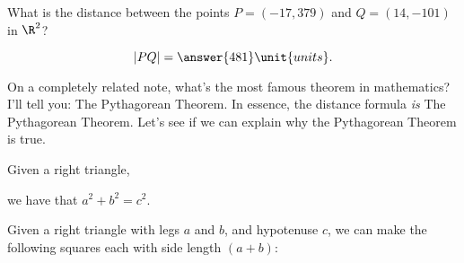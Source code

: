 \documentclass{ximera}
\begin{document}
\begin{question}
  What is the distance between the points $P=(-17,379)$ and
  $Q=(14,-101)$ in $\R^2$?
  \begin{prompt}
    \[
    |PQ|=\answer{481}\unit{units}.
    \]
  \end{prompt}
\end{question}

On a completely related note, what's the most famous theorem in
mathematics? I'll tell you: The Pythagorean Theorem. In essence, the
distance formula \textit{is} The Pythagorean Theorem. Let's see if we
can explain why the Pythagorean Theorem is true.

\begin{theorem}
  Given a right triangle,
  \begin{image}
  \end{image}
  we have that $a^2 + b^2 = c^2.$
  \begin{explanation}
    Given a right triangle with legs $a$ and $b$, and hypotenuse $c$,
    we can make the following squares each with side length $(a+b)$:
    \begin{image}
\end{image}
\end{explanation}
\end{theorem}
\end{document}
